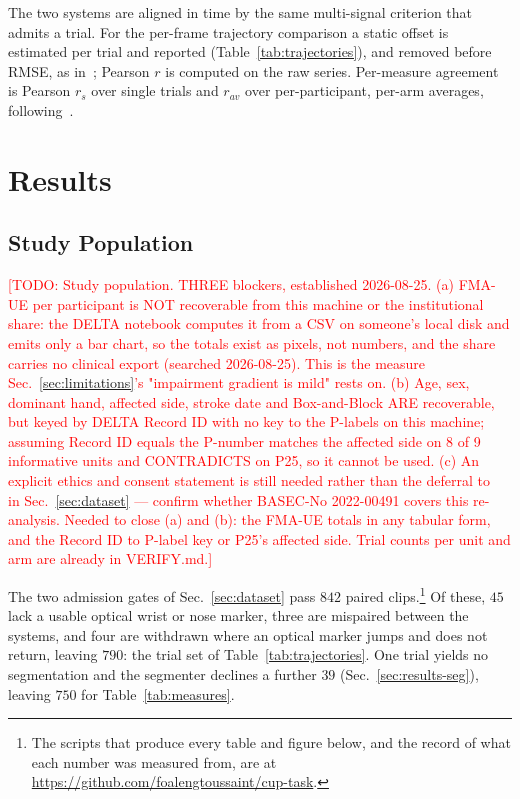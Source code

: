 \documentclass[conference]{IEEEtran}
\newcommand{\todo}[1]{\textcolor{red}{[TODO: #1]}}
\begin{document}
The two systems are aligned in time by the same multi-signal criterion that
admits a trial. For the per-frame trajectory comparison a static offset is
estimated per trial and reported (Table~\ref{tab:trajectories}), and removed
before RMSE, as in~\cite{unger2024}; Pearson $r$ is computed on the raw series. Per-measure agreement is Pearson $r_s$ over single trials
and $r_{av}$ over per-participant, per-arm averages, following~\cite{unger2024}.

\section{Results}
\label{sec:results}

\subsection{Study Population}
\todo{Study population. THREE blockers, established 2026-08-25. (a) FMA-UE per participant is NOT recoverable from this machine or the institutional share: the DELTA notebook computes it from a CSV on someone's local disk and emits only a bar chart, so the totals exist as pixels, not numbers, and the share carries no clinical export (searched 2026-08-25). This is the measure Sec.~\ref{sec:limitations}'s "impairment gradient is mild" rests on. (b) Age, sex, dominant hand, affected side, stroke date and Box-and-Block ARE recoverable, but keyed by DELTA Record ID with no key to the P-labels on this machine; assuming Record ID equals the P-number matches the affected side on 8 of 9 informative units and CONTRADICTS on P25, so it cannot be used. (c) An explicit ethics and consent statement is still needed rather than the deferral to~\cite{unger2024} in Sec.~\ref{sec:dataset} --- confirm whether BASEC-No 2022-00491 covers this re-analysis. Needed to close (a) and (b): the FMA-UE totals in any tabular form, and the Record ID to P-label key or P25's affected side. Trial counts per unit and arm are already in VERIFY.md.}

The two admission gates of Sec.~\ref{sec:dataset} pass $842$ paired
clips.\footnote{The scripts that produce every table and figure below, and the
record of what each number was measured from, are at
\url{https://github.com/foalengtoussaint/cup-task}.} Of
these, $45$ lack a usable optical wrist or nose marker, three are mispaired
between the systems, and four are withdrawn where an optical marker jumps and
does not return, leaving $790$: the trial set of Table~\ref{tab:trajectories}. One trial
yields no segmentation and the segmenter declines a further $39$
(Sec.~\ref{sec:results-seg}), leaving $750$ for Table~\ref{tab:measures}.
\end{document}
